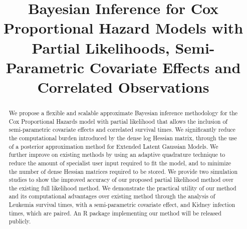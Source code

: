 \documentclass[ba]{imsart}
\begin{document}

\begin{frontmatter}
\title{Bayesian Inference for Cox Proportional Hazard Models with Partial Likelihoods, Semi-Parametric Covariate Effects and Correlated Observations}

\runtitle{}


\begin{abstract}
We propose a flexible and scalable approximate Bayesian inference methodology for the Cox Proportional Hazards model with partial likelihood that allows the inclusion of semi-parametric covariate effects and correlated survival times. We significantly reduce the computational burden introduced by the dense log Hessian matrix, through the use of a posterior approximation method for Extended Latent Gaussian Models. We further improve on existing methods by using an adaptive quadrature technique to reduce the amount of specialist user input required to fit the model, and to minimize the number of dense Hessian matrices required to be stored. We provide two simulation studies to show the improved accuracy of our proposed partial likelihood method over the existing full likelihood method. We demonstrate the practical utility of our method and its computational advantages over existing method through the analysis of Leukemia survival times, with a semi-parametric covariate effect, and Kidney infection times, which are paired. An R package implementing our method will be released publicly.
\end{abstract}

\begin{keyword}
\end{keyword}

\end{frontmatter}
\end{document}
